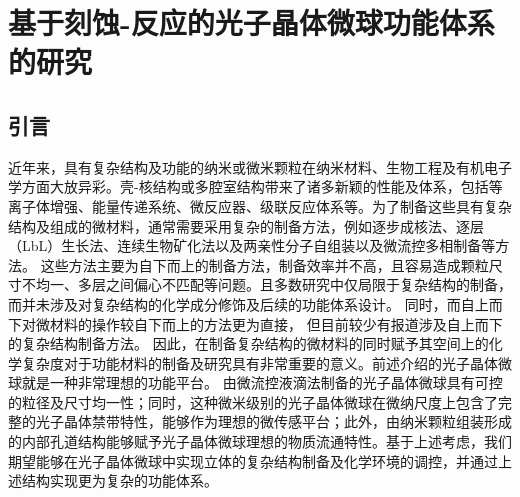 
\chapter{基于刻蚀-反应的光子晶体微球功能体系的研究}
\label{ch:etch-reaction}

\section{引言}

近年来，具有复杂结构及功能的纳米或微米颗粒在纳米材料、生物工程及有机电子学方面大放异彩。壳-核结构或多腔室结构带来了诸多新颖的性能及体系，包括等离子体增强\cite{Jin2010Multifunctional,Lim2011Highly}、能量传递系统\cite{Dimaio2008Controlling}、微反应器\cite{Peters2012From}、级联反应体系\cite{Vriezema2007Positional,Oers2014Cascade}等。为了制备这些具有复杂结构及组成的微材料，通常需要采用复杂的制备方法，例如逐步成核法\cite{Yec2012Synthetic}、逐层（LbL）生长法\cite{Son2013Systematic}、连续生物矿化法\cite{Shi2011Facile}以及两亲性分子自组装\cite{Zhang2014TemplateDirected,Tanaka2009Control,Koebe2012Crosslinked,Doh2004Photogenerated}以及微流控多相制备\cite{Ma2013CoreShell,Kim2011Generation}等方法。
这些方法主要为自下而上的制备方法，制备效率并不高，且容易造成颗粒尺寸不均一、多层之间偏心不匹配等问题\cite{Yec2012Synthetic}。且多数研究中仅局限于复杂结构的制备，而并未涉及对复杂结构的化学成分修饰及后续的功能体系设计。
同时，而自上而下对微材料的操作较自下而上的方法更为直接，
但目前较少有报道涉及自上而下的复杂结构制备方法。
因此，在制备复杂结构的微材料的同时赋予其空间上的化学复杂度对于功能材料的制备及研究具有非常重要的意义。前述介绍的光子晶体微球就是一种非常理想的功能平台。
由微流控液滴法制备的光子晶体微球具有可控的粒径及尺寸均一性；同时，这种微米级别的光子晶体微球在微纳尺度上包含了完整的光子晶体禁带特性，能够作为理想的微传感平台；此外，由纳米颗粒组装形成的内部孔道结构能够赋予光子晶体微球理想的物质流通特性。基于上述考虑，我们期望能够在光子晶体微球中实现立体的复杂结构制备及化学环境的调控，并通过上述结构实现更为复杂的功能体系。

